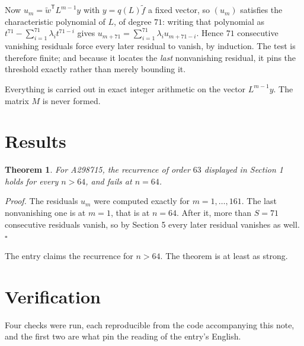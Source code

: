 \documentclass[11pt]{article}
\newtheorem{theorem}{Theorem}
\theoremstyle{definition}
\begin{document}
Now $u_m = \tilde w^{\mathsf T} L^{m-1} y$ with $y = q(L)\tilde f$ a fixed vector, so $(u_m)$ satisfies the characteristic polynomial of $L$, of degree $71$: writing that polynomial as $t^{71} - \sum_{i=1}^{71} \lambda_i t^{71-i}$ gives $u_{m+71} = \sum_{i=1}^{71} \lambda_i u_{m+71-i}$. Hence $71$ consecutive vanishing residuals force every later residual to vanish, by induction. The test is therefore finite; and because it locates the {\itshape last} nonvanishing residual, it pins the threshold exactly rather than merely bounding it.

Everything is carried out in exact integer arithmetic on the vector $L^{m-1}y$. The matrix $M$ is never formed.

\section{Results}

\begin{theorem} For A298715, the recurrence of order $63$ displayed in Section 1 holds for every $n > 64$, and fails at $n = 64$.\end{theorem}

{\itshape Proof.} The residuals $u_m$ were computed exactly for $m = 1,\dots,161$. The last nonvanishing one is at $m = 1$, that is at $n = 64$. After it, more than $S = 71$ consecutive residuals vanish, so by Section 5 every later residual vanishes as well. $\square$

The entry claims the recurrence for $n > 64$. The theorem is at least as strong.

\section{Verification}

Four checks were run, each reproducible from the code accompanying this note, and the first two are what pin the reading of the entry's English.
\end{document}
